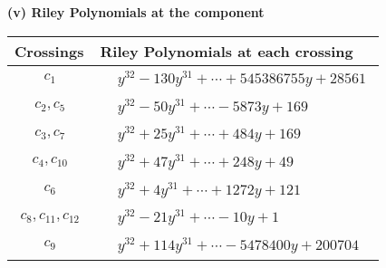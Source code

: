 \documentclass[1p]{elsarticle_modified}
\theoremstyle{definition}
\begin{document}
\flushleft \textbf{(v) Riley Polynomials at the component}\newline \\
\begin{tabular}{m{50pt}|m{274pt}}
Crossings & \hspace{64pt}Riley Polynomials at each crossing \\
\hline $$\begin{aligned}c_{1}\end{aligned}$$&$\begin{aligned}
&y^{32}-130 y^{31}+\cdots+545386755 y+28561
\end{aligned}$\\
\hline $$\begin{aligned}c_{2},c_{5}\end{aligned}$$&$\begin{aligned}
&y^{32}-50 y^{31}+\cdots-5873 y+169
\end{aligned}$\\
\hline $$\begin{aligned}c_{3},c_{7}\end{aligned}$$&$\begin{aligned}
&y^{32}+25 y^{31}+\cdots+484 y+169
\end{aligned}$\\
\hline $$\begin{aligned}c_{4},c_{10}\end{aligned}$$&$\begin{aligned}
&y^{32}+47 y^{31}+\cdots+248 y+49
\end{aligned}$\\
\hline $$\begin{aligned}c_{6}\end{aligned}$$&$\begin{aligned}
&y^{32}+4 y^{31}+\cdots+1272 y+121
\end{aligned}$\\
\hline $$\begin{aligned}c_{8},c_{11},c_{12}\end{aligned}$$&$\begin{aligned}
&y^{32}-21 y^{31}+\cdots-10 y+1
\end{aligned}$\\
\hline $$\begin{aligned}c_{9}\end{aligned}$$&$\begin{aligned}
&y^{32}+114 y^{31}+\cdots-5478400 y+200704
\end{aligned}$\\
\hline
\end{tabular}\\~\\
\end{document}
